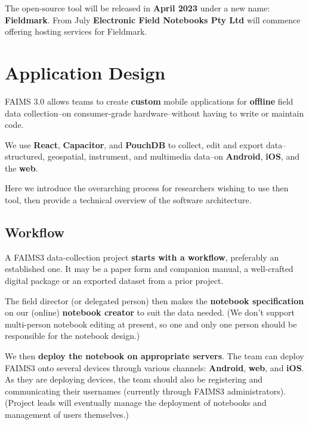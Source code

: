 \documentclass[a0,portrait]{a0poster}
\begin{document}
\begin{multicols}{3}
The open-source tool will be released in \textbf{April 2023} under a new name: \textbf{Fieldmark}. From July \textbf{Electronic Field Notebooks Pty Ltd} will commence offering hosting services for Fieldmark.






\section*{Application Design}

FAIMS 3.0 allows teams to create \textbf{custom} mobile applications for \textbf{offline} field data collection--on consumer-grade hardware--without having to write or maintain code.

We use \textbf{React}, \textbf{Capacitor}, and \textbf{PouchDB} to collect, edit and export data--structured, geospatial, instrument, and multimedia data--on \textbf{Android}, \textbf{iOS}, and the \textbf{web}. 

Here we introduce the overarching process for researchers wishing to use then tool, then provide a technical overview of the software architecture.  



\subsection*{Workflow}
A FAIMS3 data-collection project \textbf{starts with a workflow}, preferably an established one. It may be a paper form and companion manual, a well-crafted digital package or an exported dataset from a prior project.


The field director (or delegated person) then makes the \textbf{notebook specification} on our (online) \textbf{notebook creator} to suit the data needed. (We don’t support multi-person notebook editing at present, so one and only one person should be responsible for the notebook design.) 

We then \textbf{deploy the notebook on appropriate servers}. The team can deploy FAIMS3 onto several devices through various channels: \textbf{Android}, \textbf{web}, and \textbf{iOS}. As they are deploying devices, the team should also be registering and communicating their usernames (currently through FAIMS3 administrators). (Project leads will eventually manage the deployment of notebooks and management of users themselves.)



\end{multicols}
\end{document}
